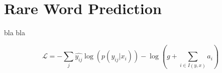 \chapter{Rare Word Prediction}

bla bla 

\begin{equation}
	\mathcal{L}=-\sum_{j} \hat{y_{ij}}\log(p(y_{ij}|x_i)) -\log(g + \sum_{i \in I(y,x)}a_i)
\end{equation}